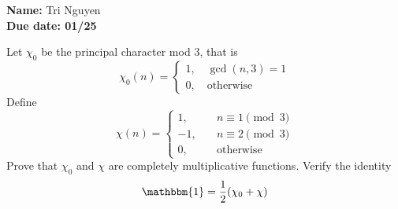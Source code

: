 \documentclass[11pt,letterpaper]{article}
\newcommand{\homework}[2]{\noindent\textbf{Name: }{Tri Nguyen} \hfill \textbf{} \\  \textbf{Due date: #2} \hfill \textbf{}\\}
\DeclareMathOperator{\1}{\mathbbm{1}}
\begin{document}
\homework{\#}{01/25}


\begin{exercise}
  Let $\chi_0$ be the principal character mod $3$, that is
  \[\chi_0 (n) = \begin{cases}
      1 , \quad \gcd(n,3)=1 \\
      0, \quad \text{otherwise}
    \end{cases}\]
  Define
  \[\chi(n) = \begin{cases}
      1, \quad  & n \equiv 1 \pmod 3 \\
      -1, \quad & n \equiv 2 \pmod 3 \\
      0, \quad  & \text{otherwise}
    \end{cases}\]
  Prove that $\chi_0$ and $\chi$ are completely multiplicative functions. Verify the identity
  \[ \mathbbm{1} = \dfrac{1}{2}(\chi_0 +\chi)\]
\end{exercise}
\end{document}
